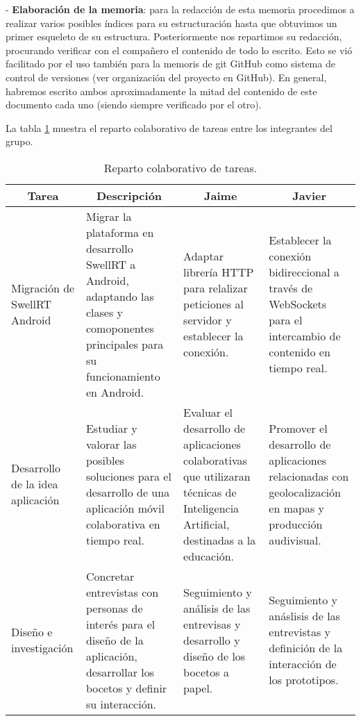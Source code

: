 - \textbf{Elaboración de la memoria}: para la redacción de esta memoria procedimos a realizar varios posibles índices para su estructuración hasta que obtuvimos un primer esqueleto de su estructura. Posteriormente nos repartimos su redacción, procurando verificar con el compañero el contenido de todo lo escrito. Esto se vió facilitado por el uso también para la memoris de git  GitHub como sistema de control de versiones (ver organización del proyecto en GitHub). En general, habremos escrito ambos aproximadamente la mitad del contenido de este documento cada uno (siendo siempre verificado por el otro).

La tabla \ref{fig:tableTasks} muestra el reparto colaborativo de tareas entre los integrantes del grupo.

\begin{table}[!]
\centering
\caption{Reparto colaborativo de tareas.}
\label{fig:tableTasks}
\begin{sideways}
\begin{tabular}{|m{3cm}|m{5.5cm}|m{5cm}|m{5cm}|}
\hline
\multicolumn{1}{|c|}{{\bf Tarea}} & \multicolumn{1}{c|}{{\bf Descripción}}                                                                                                   & \multicolumn{1}{c|}{{\bf Jaime}}                                                                                                   & \multicolumn{1}{c|}{{\bf Javier}}                                                                            \\ \hline
Migración de SwellRT Android & Migrar la plataforma en desarrollo SwellRT a Android, adaptando las clases y comoponentes principales para su funcionamiento en Android. & Adaptar librería HTTP para relalizar peticiones al servidor y establecer la conexión.                              & Establecer la conexión bidireccional a través de WebSockets para el intercambio de contenido en tiempo real. \\ \hline
Desarrollo de la idea aplicación  & Estudiar y valorar las posibles soluciones para el desarrollo de una aplicación móvil colaborativa en tiempo real.                       & Evaluar el desarrollo de aplicaciones colaborativas que utilizaran técnicas de Inteligencia Artificial, destinadas a la educación. & Promover el desarrollo de aplicaciones relacionadas con geolocalización en mapas y producción audivisual.    \\ \hline
Diseño e investigación & Concretar entrevistas con personas de interés para el diseño de la aplicación, desarrollar los bocetos y definir su interacción. & Seguimiento y análisis de las entrevisas y desarrollo y diseño de los bocetos a papel. & Seguimiento y anáslisis de las entrevistas y definición de la interacción de los prototipos.                 \\ \hline

\end{tabular}
\end{sideways}
\end{table}
